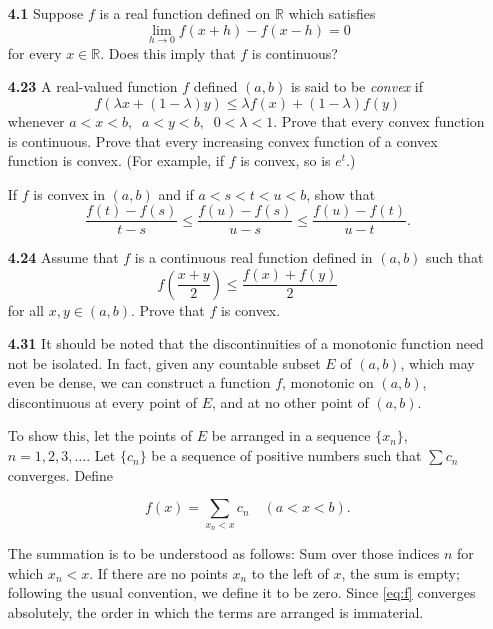 \documentclass[11pt]{article}
\begin{document}
\begin{itemize}
  \item [\textbf{4.1}] Suppose \(f\) is a real function defined on \(\mathbb{R}\) which satisfies 
    \[\lim_{h \to 0} f(x+h) - f(x-h) = 0\]
    for every \(x \in \mathbb{R}\).  Does this imply that \(f\) is continuous?
    \newpage

  \item [\textbf{4.23}] A real-valued function \(f\) defined \((a,b)\) is said to be \textit{convex} if
    \[f(\lambda x + (1 - \lambda)y) \leq \lambda f(x) + (1 - \lambda) f(y)\]
    whenever \(a < x < b, \;\; a < y < b, \;\; 0 < \lambda < 1\).  Prove that every convex function 
    is continuous.  Prove that every increasing convex function of a convex function is convex. 
    (For example, if \(f\) is convex, so is \(e^t\).)

    If \(f\) is convex in \((a,b)\) and if \(a < s < t < u < b\), show that 
    \[\frac{f(t) - f(s)}{t - s} \leq \frac{f(u) - f(s)}{u - s} \leq \frac{f(u) - f(t)}{u - t}.\]
    \newpage

  \item [\textbf{4.24}] Assume that \(f\) is a continuous real function defined in \((a,b)\) such that 
    \[f \left(\frac{x + y}{2}\right) \leq \frac{f(x) + f(y)}{2}\]
    for all \(x,y \in (a,b)\).  Prove that \(f\) is convex.
    \newpage

  \item [\textbf{4.31}]
    It should be noted that the discontinuities of a monotonic function need not be isolated.  In fact, 
    given any countable subset \(E\) of \((a,b)\), which may even be dense, we can construct a function 
    \(f\), monotonic on \((a,b)\), discontinuous at every point of \(E\), and at no other point of 
    \((a,b)\). 

    To show this, let the points of \(E\) be arranged in a sequence \(\{x_n\}\), \(n = 1,2,3,\dots\). 
    Let \(\{c_n\}\) be a sequence of positive numbers such that \(\sum c_n\) converges.  Define

    \begin{equation} f(x) = \sum_{x_n < x} c_n \quad (a < x < b). \tag{31}\label{eq:f} \end{equation}

    The summation is to be understood as follows: Sum over those indices \(n\) for which \(x_n < x\). 
    If there are no points \(x_n\) to the left of \(x\), the sum is empty; following the usual 
    convention, we define it to be zero.  Since \eqref{eq:f} converges absolutely, the order in which 
    the terms are arranged is immaterial.


\end{itemize}
\end{document}
